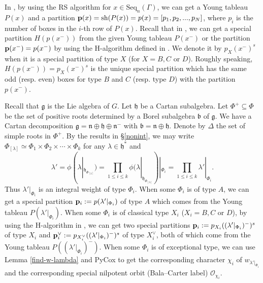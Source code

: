 \documentclass[reqno,12pt]{amsart}
\numberwithin{equation}{section}
\theoremstyle{plain}
\theoremstyle{definition}
\newcommand{\lam}{\lambda}
\renewcommand{\subset}{\subseteq}
\newcommand{\lest}{\leqslant}
\begin{document}

In \cite{BXX}, by using the RS algorithm for $x\in  \mathrm{Seq}_n (\Gamma)$, we can get a Young tableau $P(x)$ and a partition ${\bf p}(x)=\mathrm{sh}(P(x))=p(x)=[p_1,p_2,...,p_N]$, where $p_i$ is the number of boxes in the $i$-th
row of $P(x)$.  
Recall that in \cite{BMW}, we can get a special partition $H(p(x^-))$ from the given Young tableau $P(x^-)$ or the partition ${\bf p}(x^-)=p(x^-)$ by using the H-algorithm defined in \cite{BMW}. We denote it by $p_{X}(x^-)^s$ when it is a special partition of type $X$ (for $X=B,C$ or $D$). Roughly speaking, $H(p(x^-))=p_{X}(x^-)^s$ is the unique  special partition which has the same odd (resp. even) boxes for type $B$
and $C$ (resp. type $D$) with the partition $p(x^-)$.



Recall that  $\mathfrak{g}$ is the Lie algebra of $G$. Let $\mathfrak{h}$ be a Cartan subalgebra.
	Let $\Phi^+\subset\Phi$ be the set of positive roots determined by a Borel subalgebra $\mathfrak{b}$ of $\mathfrak{g}$. We have a Cartan decomposition $\mathfrak{g}=\mathfrak{n}\oplus\mathfrak{h}\oplus\mathfrak{n}^-$ with $\mathfrak{b}=\mathfrak{n}\oplus \mathfrak{h}$. Denote by $\Delta$ the set of simple roots in $\Phi^+$.
By the results in \S \ref{nonint}, we may write $\Phi_{[\lambda]}\simeq \Phi_1\times \Phi_2\times \cdots\times \Phi_k$ for any $\lambda\in \mathfrak{h}^*$ and $$\lam'=\phi(\lam|_{\mathfrak{h}_{\Phi_{[\lambda]}}})=\prod\limits_{1\lest i\lest k} \phi(\lambda|_{\mathfrak{h}_{\Phi_{[\lambda]}}})|_{{\Phi_i}}=\prod\limits_{1\lest i\lest k} \lam'|_{{\Phi_i}}.$$ Thus ${\lam}'|_{\Phi_i}$ is an integral weight of type $\Phi_i$. When some $\Phi_i$ is of type $A$, we can get a special partition ${\bf p}_{i}:=p(\lam'|_{{\Phi_i}})$ of type $A$ which comes from the Young tableau $P(\lam'|_{{\Phi_i}})$.
When some $\Phi_i$ is of classical type $X_i$ ($X_i=B,C$ or $D$), by using the H-algorithm in \cite{BMW}, we can get two special partitions ${\bf p}_{i}:=p_{X_i}((\lam'|_{{\Phi_i}})^-)^s$ of type $X_i$ and  ${\bf p}^{\vee}_{i}:=p_{X_i^{\vee}}((\lam'|_{{\Phi_i}})^-)^s$ of type $X_i^{\vee}$, both of which come from the Young tableau $P((\lam'|_{{\Phi_i}})^-)$. When some $\Phi_i$ is of exceptional type, we can use  Lemma \ref{find-w-lambda} and PyCox to get  the corresponding character $\chi_i$ of $w_{\lam'|_{{\Phi_i}}}$ and the corresponding special  nilpotent orbit (Bala--Carter label) $\mathcal{O}_{\chi_i}$. 
\end{document}
